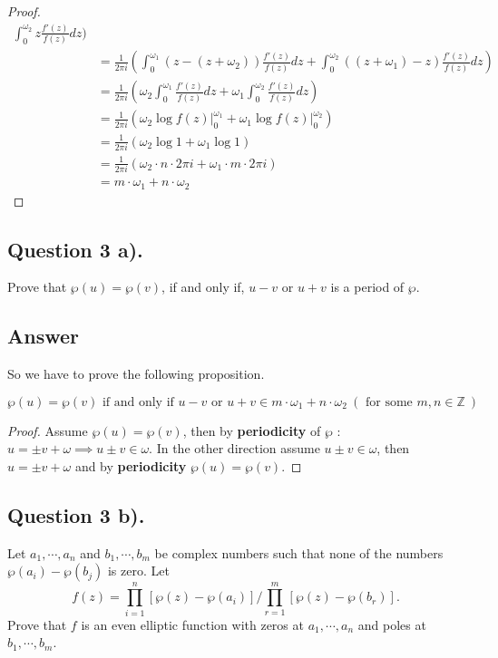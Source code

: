 \begin{proof}
\begin{align*}
        \int_{0}^{\omega_2} z \frac{f'(z)}{f(z)} dz ) \\
        &= \frac{1}{2 \pi i} ( \int_{0}^{\omega_1} ( z - (z + \omega_2) ) \frac{f'(z)}{f(z)} dz +
        \int_{0}^{\omega_2} ((z + \omega_1) -z ) \frac{f'(z)}{f(z)} dz ) \\
        &= \frac{1}{2 \pi i} ( \omega_2 \int_{0}^{\omega_1} \frac{f'(z)}{f(z)} dz +
        \omega_1 \int_{0}^{\omega_2} \frac{f'(z)}{f(z)} dz ) \\
        &= \frac{1}{2 \pi i} ( \omega_2 \log{f(z)} \rvert_{0}^{\omega_1} + \omega_1 \log{f(z)} \rvert_{0}^{\omega_2} ) \\
        &= \frac{1}{2 \pi i} ( \omega_2 \log{1} + \omega_1 \log{1} ) \\
        &= \frac{1}{2 \pi i} ( \omega_2 \cdot n \cdot 2 \pi i + \omega_1 \cdot m \cdot 2 \pi i ) \\
        & = m \cdot \omega_1 + n \cdot \omega_2
    \end{align*}
\end{proof}


\subsection{Question 3 a).}
\noindent
Prove that $\wp(u)=\wp(v)$, if and only if, $u-v$ or $u+v$ is a period of $\wp$.

\subsection*{Answer}
\noindent
So we have to prove the following proposition.

\begin{proposition}
    \[
        \wp(u)=\wp(v) \text{ if and only if } u-v \text{ or } u+v \in m \cdot \omega_1 + n \cdot \omega_2
        \  ( \text{ for some } m,n \in \mathbb{Z} \  )
    \]
\end{proposition}

\begin{proof}
    Assume $\wp(u) = \wp(v)$, then by \textbf{periodicity} of $\wp$ : $u= \pm v+\omega \implies u \pm v \in \omega$.
    In the other direction assume $u \pm v \in \omega$, then $u= \pm v+\omega$ and by \textbf{periodicity}
    $\wp(u) = \wp(v)$.
\end{proof}


\subsection{Question 3 b).}
\noindent
Let $a_1, \cdots , a_n$ and $b_1, \cdots , b_m$ be complex numbers such that none of the numbers $\wp(a_i) - \wp(b_j)$
is zero. Let
\[
    f(z) = \prod_{i=1}^{n} [ \wp(z) - \wp(a_i) ] / \prod_{r=1}^{m} [ \wp(z) - \wp(b_r) ].
\]
Prove that $f$ is an even elliptic function with zeros at $a_1, \cdots , a_n$ and poles at $b_1, \cdots , b_m$.

